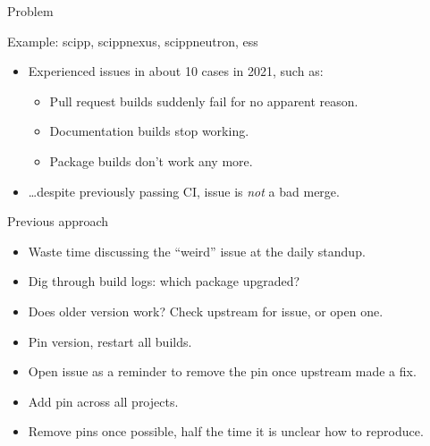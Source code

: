 \documentclass[english,aspectratio=1610,smaller]{beamer}
\begin{document}
\begin{frame}{Problem}
  \begin{block}{Example: scipp, scippnexus, scippneutron, ess}
    \begin{itemize}
      \item Experienced issues in about 10 cases in 2021, such as:
        \begin{itemize}
          \item Pull request builds suddenly fail for no apparent reason.
          \item Documentation builds stop working.
          \item Package builds don't work any more.
        \end{itemize}
      \item \alert{\dots despite previously passing CI}, issue is \emph{not} a bad merge.
    \end{itemize}
  \end{block}
  \begin{block}{Previous approach}
    \begin{itemize}
      \item Waste time discussing the ``weird'' issue at the daily standup.
      \item Dig through build logs: which package upgraded?
      \item Does older version work? Check upstream for issue, or open one.
      \item Pin version, restart all builds.
      \item Open issue as a reminder to remove the pin once upstream made a fix.
      \item Add pin across all projects.
      \item Remove pins once possible, half the time it is unclear how to reproduce.
    \end{itemize}
  \end{block}
\end{frame}
\end{document}
